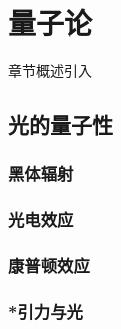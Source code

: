 \chapter{量子论}\label{29}

章节概述引入

\section{光的量子性}\label{29-1}

\subsection{黑体辐射}\label{29-1-1}

\subsection{光电效应}\label{29-1-2}

\subsection{康普顿效应}\label{29-1-3}

\subsection{*引力与光}\label{29-1-4}
